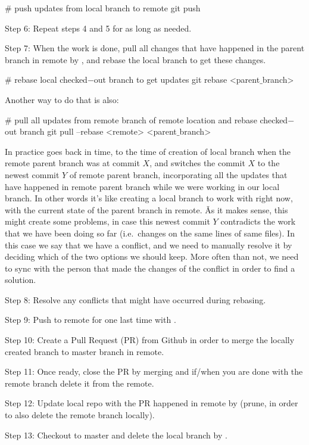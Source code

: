 \begin{bash}
# push updates from local branch to remote
git push
\end{bash}

\item Step 6: Repeat steps 4 and 5 for as long as needed.
\item Step 7: When the work is done, pull all changes that have happened in the parent branch in remote by , and rebase the local branch to get these changes.

\begin{bash}
# rebase local checked$-$out branch to get updates
git rebase <parent$\_$branch>
\end{bash}

Another way to do that is also:

\begin{bash}
# pull all updates from remote branch of remote location and rebase checked$-$out branch
git pull --rebase <remote> <parent$\_$branch>
\end{bash}

In practice  goes back in time, to the time of creation of local branch when the remote parent
branch was at commit $X$, and switches the commit $X$ to the newest commit $Y$ of remote parent branch, incorporating
all the updates that have happened in remote parent branch while we were working in our local branch. In other words
it’s like creating a local branch to work with right now, with the current state of the parent branch in remote. \v

As it makes sense, this might create some problems, in case this newest commit $Y$ contradicts the work that we have
been doing so far (i.e.\ changes on the same lines of same files). In this case we say that we have a conflict, and we
need to manually resolve it by deciding which of the two options we should keep. More often than not, we need to sync
with the person that made the changes of the conflict in order to find a solution.
\item Step 8: Resolve any conflicts that might have occurred during rebasing.
\item Step 9: Push to remote for one last time with .
\item Step 10: Create a Pull Request (PR) from Github in order to merge the locally created branch to master branch in
remote.
\item Step 11: Once ready, close the PR by merging and if/when you are done with the remote branch delete it from the
remote.
\item Step 12: Update local repo with the PR happened in remote by  (prune, in order to also
delete the remote branch locally).
\item Step 13: Checkout to master and delete the local branch by .
\eit

